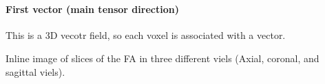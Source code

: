 \documentclass[
	12pt,				%
	openright,			%
 twoside,			%
	letterpaper,		%
	english,			%
	brazil,				%
	sumario=tradicional,
	]{abntex2}
\begin{document}
    \begin{center}
    \end{center}
    { \hspace*{\fill} \\}
    
    \paragraph{First vector (main tensor
direction)}\label{first-vector-main-tensor-direction}

This is a 3D vecotr field, so each voxel is associated with a vector.

Inline image of slices of the FA in three different viels (Axial,
coronal, and sagittal viels).
\end{document}
